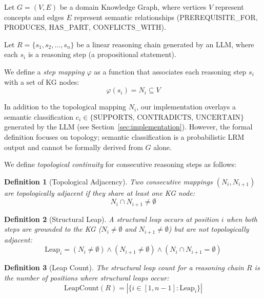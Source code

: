 \documentclass[journal,review]{vgtc}
\newtheorem{definition}{Definition}
\begin{document}
Let $G = (V, E)$ be a domain Knowledge Graph, where vertices $V$ represent concepts and edges $E$ represent semantic relationships (PREREQUISITE\_FOR, PRODUCES, HAS\_PART, CONFLICTS\_WITH).

Let $R = \{s_1, s_2, \ldots, s_n\}$ be a linear reasoning chain generated by an LLM, where each $s_i$ is a reasoning step (a propositional statement).

We define a \textit{step mapping} $\varphi$ as a function that associates each reasoning step $s_i$ with a set of KG nodes:
\begin{equation}
\varphi(s_i) = N_i \subseteq V
\end{equation}

In addition to the topological mapping $N_i$, our implementation overlays a semantic classification $c_i \in \{\text{SUPPORTS, CONTRADICTS, UNCERTAIN}\}$ generated by the LLM (see Section~\ref{sec:implementation}). However, the formal definition focuses on topology; semantic classification is a probabilistic LRM output and cannot be formally derived from $G$ alone.

We define \textit{topological continuity} for consecutive reasoning steps as follows:

\begin{definition}[Topological Adjacency]
Two consecutive mappings $(N_i, N_{i+1})$ are \textit{topologically adjacent} if they share at least one KG node:
\begin{equation}
N_i \cap N_{i+1} \neq \emptyset
\end{equation}
\end{definition}

\begin{definition}[Structural Leap]
A \textit{structural leap} occurs at position $i$ when both steps are grounded to the KG ($N_i \neq \emptyset$ and $N_{i+1} \neq \emptyset$) but are not topologically adjacent:
\begin{equation}
\text{Leap}_i = (N_i \neq \emptyset) \land (N_{i+1} \neq \emptyset) \land (N_i \cap N_{i+1} = \emptyset)
\end{equation}
\end{definition}

\begin{definition}[Leap Count]
The \textit{structural leap count} for a reasoning chain $R$ is the number of positions where structural leaps occur:
\begin{equation}
\text{LeapCount}(R) = \left|\{i \in [1, n-1] : \text{Leap}_i\}\right|
\end{equation}
\end{definition}
\end{document}
